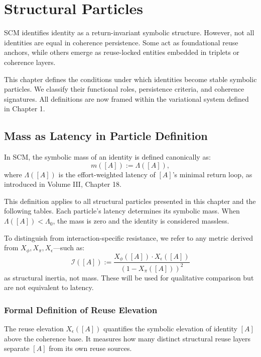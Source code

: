 \chapter{Structural Particles} \label{chapter-structural-particles}

SCM identifies identity as a return-invariant symbolic structure. However, not all identities are equal in coherence persistence. Some act as foundational reuse anchors, while others emerge as reuse-locked entities embedded in triplets or coherence layers.

This chapter defines the conditions under which identities become stable symbolic particles. We classify their functional roles, persistence criteria, and coherence signatures. All definitions are now framed within the variational system defined in Chapter 1.

\section{Mass as Latency in Particle Definition} \label{sec:mass-latency-particles}

In SCM, the symbolic mass of an identity is defined canonically as:
\[
m([A]) := \Lambda([A]),
\]
where $\Lambda([A])$ is the effort-weighted latency of $[A]$'s minimal return loop, as introduced in Volume III, Chapter 18.

This definition applies to all structural particles presented in this chapter and the following tables. Each particle's latency determines its symbolic mass. When $\Lambda([A]) < \Lambda_0$, the mass is zero and the identity is considered massless.

To distinguish from interaction-specific resistance, we refer to any metric derived from $X_\phi, X_\pi, X_\epsilon$—such as:
\[
\mathcal{I}([A]) := \frac{X_\phi([A]) \cdot X_\epsilon([A])}{(1 - X_\pi([A]))^2}
\]
as structural inertia, not mass. These will be used for qualitative comparison but are not equivalent to latency.

\subsection{Formal Definition of Reuse Elevation} \label{sec:xe-definition}

The reuse elevation $X_\epsilon([A])$ quantifies the symbolic elevation of identity $[A]$ above the coherence base. It measures how many distinct structural reuse layers separate $[A]$ from its own reuse sources.

